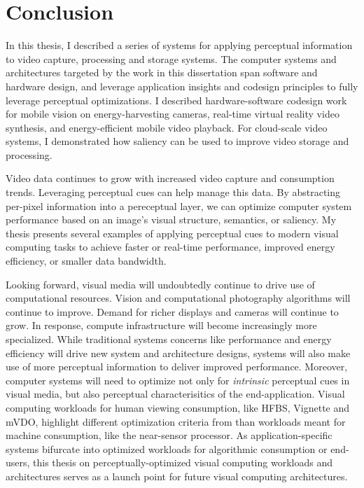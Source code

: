 \chapter{Conclusion}
\label{ch:concl}

In this thesis, I described a series of systems for applying perceptual information to video capture, processing and storage systems.
The computer systems and architectures targeted by the work in this dissertation span software and hardware design, and leverage application insights and codesign principles to fully leverage perceptual optimizations.
I described hardware-software codesign work for mobile vision on energy-harvesting cameras, real-time virtual reality video synthesis, and energy-efficient mobile video playback.
For cloud-scale video systems, I demonstrated how saliency can be used to improve video storage and processing.

Video data continues to grow with increased video capture and consumption trends. Leveraging perceptual cues can help manage this data.
By abstracting per-pixel information into a pereceptual layer, we can optimize computer system performance based on an image's visual structure, semantics, or saliency.
My thesis presents several examples of applying perceptual cues to modern visual computing tasks to achieve faster or real-time performance, improved energy efficiency, or smaller data bandwidth.

Looking forward, visual media will undoubtedly continue to drive use of computational resources.
Vision and computational photography algorithms will continue to improve.
Demand for richer displays and cameras will continue to grow.
In response, compute infrastructure will become increasingly more specialized.
While traditional systems concerns like performance and energy efficiency will drive new system and architecture designs, systems will also make use of more perceptual information to deliver improved performance.
Moreover, computer systems will need to optimize not only for \emph{intrinsic} perceptual cues in visual media, but also perceptual characterisitics of the end-application.
Visual computing workloads for human viewing consumption, like HFBS, Vignette and mVDO, highlight different optimization criteria from than workloads meant for machine consumption, like the near-sensor processor.
As application-specific systems bifurcate into optimized workloads for algorithmic consumption or end-users, this thesis on perceptually-optimized visual computing workloads and architectures serves as a launch point for future visual computing architectures.
